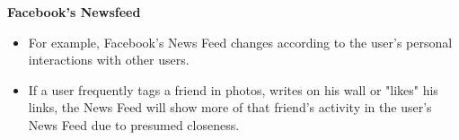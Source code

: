 \documentclass[MASTER.tex]{subfiles}
\begin{document}
\begin{frame}
	\LARGE
	\textbf{Facebook's Newsfeed}
	\begin{itemize}
	\item For example, Facebook's News Feed changes according to the user's personal interactions with other users. 
	\item If a user frequently tags a friend in photos, writes on his wall or "likes" his links, the News Feed will show more of that friend's activity in the user's News Feed due to presumed closeness.
	\end{itemize}
	
	
\end{frame}
\end{document}
